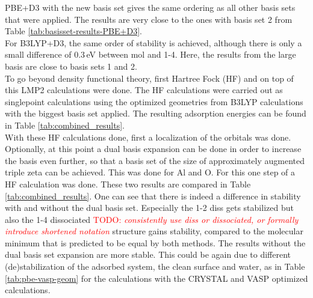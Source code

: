 \documentclass[11pt,DIV=13,BCOR=5mm,a4paper,headinclude]{scrbook}
\newcommand\todo[1]{\textcolor{red}{TODO: \textit{{#1}}}}
\begin{document}
PBE+D3 with the new basis set gives the same ordering as all other basis sets that were applied.
The results are very close to the ones with basis set 2 from Table \ref{tab:basisset-results-PBE+D3}.
\\
For B3LYP+D3, the same order of stability is achieved, although there is only a small difference of $0.3\,$eV between mol and 1-4.
Here, the results from the large basis are close to basis sets 1 and 2.
\\
To go beyond density functional theory, first Hartree Fock (HF) and on top of this LMP2 calculations were done.
The HF calculations were carried out as singlepoint calculations using the optimized geometries from B3LYP calculations with the biggest basis set applied.
The resulting adsorption energies can be found in Table \ref{tab:combined_results}. %
\\
With these HF calculations done, first a localization of the orbitals was done.
Optionally, at this point a dual basis expansion can be done in order to increase the basis even further, so that a basis set of the size of approximately augmented triple zeta can be achieved.
This was done for Al and O.
For this one step of a HF calculation was done.
These two results are compared in Table \ref{tab:combined_results}. %
One can see that there is indeed a difference in stability with and without the dual basis set.
Especially the 1-2 diss gets stabilized but also the 1-4 dissociated \todo{consistently use diss or dissociated, or formally introduce shortened notation} structure gains stability, compared to the molecular minimum that is predicted to be equal by both methods.
The results without the dual basis set expansion are more stable.
This could be again due to different (de)stabilization of the adsorbed system, the clean surface and water, as in Table \ref{tab:pbe-vasp-geom} for the calculations with the CRYSTAL and VASP optimized calculations.
\end{document}
